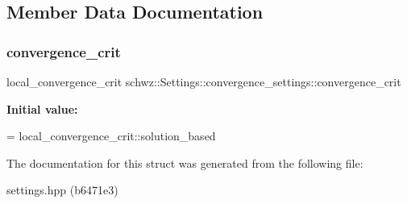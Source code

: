 \subsection{Member Data Documentation}
\mbox{\label{structschwz_1_1Settings_1_1convergence__settings_a509f2b6af29a7afeafda9d45f8e12623}} 
\subsubsection{\texorpdfstring{convergence\+\_\+crit}{convergence\_crit}}
{\footnotesize\ttfamily local\+\_\+convergence\+\_\+crit schwz\+::\+Settings\+::convergence\+\_\+settings\+::convergence\+\_\+crit}

{\bfseries Initial value\+:}
\begin{DoxyCode}
=
            local\_convergence\_crit::solution\_based
\end{DoxyCode}


The documentation for this struct was generated from the following file\+:\begin{DoxyCompactItemize}
\item 
settings.\+hpp (b6471e3)\end{DoxyCompactItemize}
